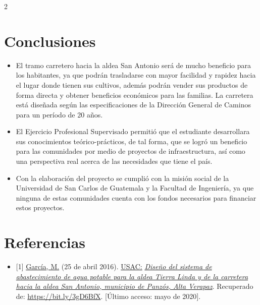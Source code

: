 \documentclass[12pt,spanish,Letterpaper,openany]{book}
\providecommand{\tightlist}{%
  \setlength{\itemsep}{0pt}\setlength{\parskip}{0pt}}
\newcommand{\spacethreemilis}{\vspace{3mm}}
\begin{document}
\begin {multicols}{2}

\spacethreemilis

\hypertarget{conclusiones}{%
\section{Conclusiones}\label{conclusiones}}

\begin{itemize}
\item
  El tramo carretero hacia la aldea San Antonio será de mucho beneficio para los habitantes, ya que podrán trasladarse con mayor facilidad y rapidez hacia el lugar donde tienen sus cultivos, además podrán vender sus productos de forma directa y obtener beneficios económicos para las familias. La carretera está diseñada según las especificaciones de la Dirección General de Caminos para un período de 20 años.
\item
  El Ejercicio Profesional Supervisado permitió que el estudiante desarrollara sus conocimientos teórico-prácticos, de tal forma, que se logró un beneficio para las comunidades por medio de proyectos de infraestructura, así como una perspectiva real acerca de las necesidades que tiene el país.
\item
  Con la elaboración del proyecto se cumplió con la misión social de la Universidad de San Carlos de Guatemala y la Facultad de Ingeniería, ya que ninguna de estas comunidades cuenta con los fondos necesarios para financiar estos proyectos.
\end{itemize}

\hypertarget{referencias}{%
\section{Referencias}\label{referencias}}

\begin{itemize}
\tightlist
\item
  {[}1{]} \href{http://www.repositorio.usac.edu.gt/4300/}{García, M.} (25 de abril 2016). \href{https://www.usac.edu.gt/}{USAC:} \href{http://www.repositorio.usac.edu.gt/4300/}{\emph{Diseño del sistema de abastecimiento de agua potable para la aldea Tierra Linda y de la carretera hacia la aldea San Antonio, municipio de Panzós, Alta Verapaz}}. Recuperado de: \url{https://bit.ly/3gD6BfX}. {[}Último acceso: mayo de 2020{]}.
\end{itemize}

\end {multicols}
\end{document}
